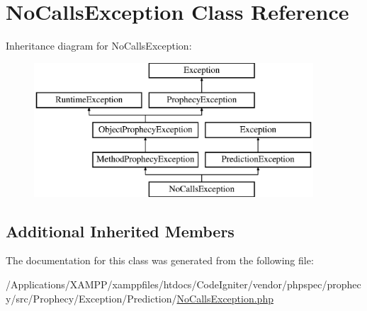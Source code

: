 \hypertarget{class_prophecy_1_1_exception_1_1_prediction_1_1_no_calls_exception}{}\section{No\+Calls\+Exception Class Reference}
\label{class_prophecy_1_1_exception_1_1_prediction_1_1_no_calls_exception}
Inheritance diagram for No\+Calls\+Exception\+:\begin{figure}[H]
\begin{center}
\leavevmode
\includegraphics[height=5.000000cm]{class_prophecy_1_1_exception_1_1_prediction_1_1_no_calls_exception}
\end{center}
\end{figure}
\subsection*{Additional Inherited Members}


The documentation for this class was generated from the following file\+:\begin{DoxyCompactItemize}
\item 
/\+Applications/\+X\+A\+M\+P\+P/xamppfiles/htdocs/\+Code\+Igniter/vendor/phpspec/prophecy/src/\+Prophecy/\+Exception/\+Prediction/\mbox{\hyperlink{_no_calls_exception_8php}{No\+Calls\+Exception.\+php}}\end{DoxyCompactItemize}
